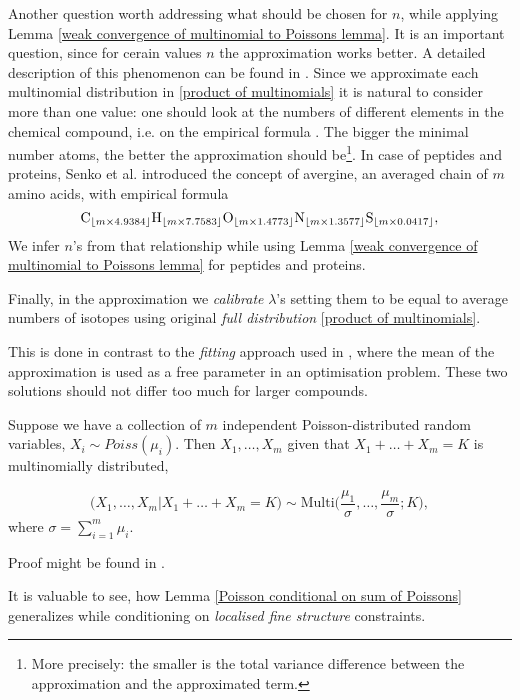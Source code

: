 Another question worth addressing what should be chosen for $n$, while applying Lemma \ref{weak convergence of multinomial to Poissons lemma}. It is an important question, since for cerain values $n$ the approximation works better. A detailed description of this phenomenon can be found in \cite{Roos1999OnTheRateOfMultivariatePoissonConvergence}. Since we approximate each multinomial distribution in \eqref{product of multinomials} it is natural to consider more than one value: one should look at the numbers of different elements in the chemical compound, i.e. on the empirical formula \molecule. The bigger the minimal number atoms, the better the approximation should be\footnote{More precisely: the smaller is the total variance difference between the approximation and the approximated term.}. In case of peptides and proteins, Senko et al. \cite{Senko1995Determination} introduced the concept of avergine, an averaged chain of $m$ amino acids, with empirical formula 
\begin{equation*}
	\cem{C}_{\lfloor m \times 4.9384\rfloor} 
	\cem{H}_{\lfloor m \times 7.7583\rfloor} 
	\cem{O}_{\lfloor m \times 1.4773\rfloor} 	
	\cem{N}_{\lfloor m \times 1.3577\rfloor} 
	\cem{S}_{\lfloor m \times 0.0417\rfloor},
\end{equation*}
We infer $n$'s from that relationship while using Lemma \ref{weak convergence of multinomial to Poissons lemma} for peptides and proteins.


Finally, in the approximation we {\it calibrate} $\lambda$'s setting them to be equal to average numbers of isotopes using original {\it full distribution} \eqref{product of multinomials}. 

This is done in contrast to the {\it fitting} approach used in \cite{Breen2000AutomaticPeak,Valkenborg2007UsingPoisson}, where the mean of the approximation is used as a free parameter in an optimisation problem. These two solutions should not differ too much for larger compounds.




\begin{lemma}\label{Poisson conditional on sum of Poissons}
	Suppose we have a collection of $m$ independent Poisson-distributed random variables, $X_i \sim Poiss(\mu_i)$. Then $X_1, \dots, X_m$ given that $X_1 + \dots + X_m = K$ is multinomially distributed,

$$ 
	\Big(X_1, \dots, X_m | X_1 + \dots + X_m = K \Big) 
	\sim 
	\mathrm{Multi}\Big( \frac{\mu_1}{\sigma}, \dots, \frac{\mu_m}{\sigma}; K \Big), 
$$
	where $\sigma = \sum_{i = 1}^m \mu_i$.	
\end{lemma}
Proof might be found in \cite{Kingman1993PoissonProcesses}. 


It is valuable to see, how Lemma \ref{Poisson conditional on sum of Poissons} generalizes while conditioning on {\it localised fine structure} constraints.
